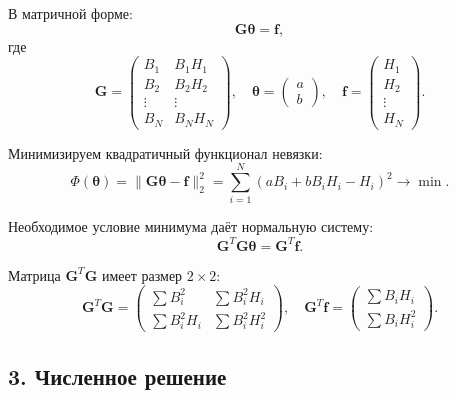 \documentclass{article}
\begin{document}
В матричной форме:
\begin{equation}
\mathbf{G} \boldsymbol{\theta} = \mathbf{f},
\label{eq:44_slau}
\end{equation}
где
\begin{equation}
\mathbf{G} =
\begin{pmatrix}
B_1 & B_1 H_1 \\
B_2 & B_2 H_2 \\
\vdots & \vdots \\
B_N & B_N H_N
\end{pmatrix}, \quad
\boldsymbol{\theta} =
\begin{pmatrix}
a \\ b
\end{pmatrix}, \quad
\mathbf{f} =
\begin{pmatrix}
H_1 \\ H_2 \\ \vdots \\ H_N
\end{pmatrix}.
\end{equation}

Минимизируем квадратичный функционал невязки:
\begin{equation}
\Phi(\boldsymbol{\theta}) = \|\mathbf{G}\boldsymbol{\theta} - \mathbf{f}\|_2^2 = \sum_{i=1}^{N} (a B_i + b B_i H_i - H_i)^2 \to \min.
\end{equation}

Необходимое условие минимума даёт нормальную систему:
\begin{equation}
\mathbf{G}^T \mathbf{G} \boldsymbol{\theta} = \mathbf{G}^T \mathbf{f}.
\label{eq:44_normal}
\end{equation}

Матрица $\mathbf{G}^T \mathbf{G}$ имеет размер $2 \times 2$:
\begin{equation}
\mathbf{G}^T \mathbf{G} =
\begin{pmatrix}
\sum B_i^2 & \sum B_i^2 H_i \\
\sum B_i^2 H_i & \sum B_i^2 H_i^2
\end{pmatrix}, \quad
\mathbf{G}^T \mathbf{f} =
\begin{pmatrix}
\sum B_i H_i \\
\sum B_i H_i^2
\end{pmatrix}.
\end{equation}

\subsection*{3. Численное решение}
\end{document}
